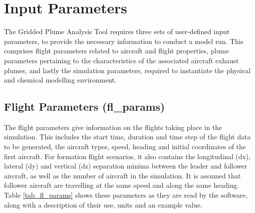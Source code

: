 \section{Input Parameters}
The Gridded Plume Analysis Tool requires three sets of user-defined input parameters, to provide the necessary information to conduct a model run. This comprises flight parameters related to aircraft and flight properties, plume parameters pertaining to the characteristics of the associated aircraft exhaust plumes, and lastly the simulation parameters, required to instantiate the physical and chemical modelling environment.

\subsection{Flight Parameters (fl\_params)}
The flight parameters give information on the flights taking place in the simulation. This includes the start time, duration and time step of the flight data to be generated, the aircraft types, speed, heading and initial coordinates of the first aircraft. For formation flight scenarios, it also contains the longitudinal (dx), lateral (dy) and vertical (dz) separation minima between the leader and follower aircraft, as well as the number of aircraft in the simulation. It is assumed that follower aircraft are travelling at the same speed and along the same heading. Table \ref{tab_fl_params} shows these parameters as they are read by the software, along with a description of their use, units and an example value.

